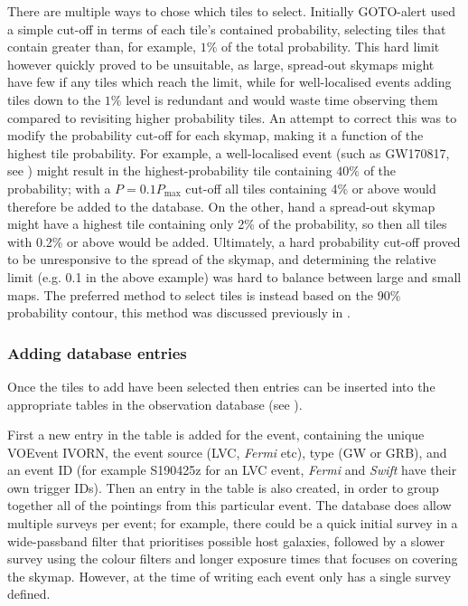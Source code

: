 \begin{colsection}
There are multiple ways to chose which tiles to select. Initially GOTO-alert used a simple cut-off in terms of each tile's contained probability, selecting tiles that contain greater than, for example, $1\%$ of the total probability. This hard limit however quickly proved to be unsuitable, as large, spread-out skymaps might have few if any tiles which reach the limit, while for well-localised events adding tiles down to the $1\%$ level is redundant and would waste time observing them compared to revisiting higher probability tiles. An attempt to correct this was to modify the probability cut-off for each skymap, making it a function of the highest tile probability. For example, a well-localised event (such as GW170817, see ) might result in the highest-probability tile containing $40\%$ of the probability; with a $P=0.1P_\text{max}$ cut-off all tiles containing 4\% or above would therefore be added to the database. On the other, hand a spread-out skymap might have a highest tile containing only 2\% of the probability, so then all tiles with 0.2\% or above would be added. Ultimately, a hard probability cut-off proved to be unresponsive to the spread of the skymap, and determining the relative limit (e.g. 0.1 in the above example) was hard to balance between large and small maps. The preferred method to select tiles is instead based on the 90\% probability contour, this method was discussed previously in .

\subsubsection{Adding database entries}

Once the tiles to add have been selected then entries can be inserted into the appropriate tables in the observation database (see ).

First a new entry in the  table is added for the event, containing the unique VOEvent IVORN, the event source (LVC, \textit{Fermi} etc), type (GW or GRB), and an event ID (for example S190425z for an LVC event, \textit{Fermi} and \textit{Swift} have their own trigger IDs). Then an entry in the  table is also created, in order to group together all of the pointings from this particular event. The database does allow multiple surveys per event; for example, there could be a quick initial survey in a wide-passband filter that prioritises possible host galaxies, followed by a slower survey using the colour filters and longer exposure times that focuses on covering the skymap. However, at the time of writing each event only has a single survey defined.


\end{colsection}
